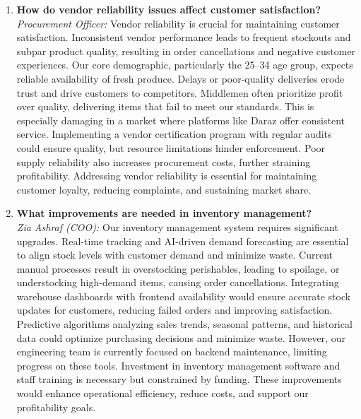 \documentclass[12pt,a4paper]{article}
\begin{document}
\begin{enumerate}
    \item \textbf{How do vendor reliability issues affect customer satisfaction?} \\
    \textit{Procurement Officer:} Vendor reliability is crucial for maintaining customer satisfaction. Inconsistent vendor performance leads to frequent stockouts and subpar product quality, resulting in order cancellations and negative customer experiences. Our core demographic, particularly the 25–34 age group, expects reliable availability of fresh produce. Delays or poor-quality deliveries erode trust and drive customers to competitors. Middlemen often prioritize profit over quality, delivering items that fail to meet our standards. This is especially damaging in a market where platforms like Daraz offer consistent service. Implementing a vendor certification program with regular audits could ensure quality, but resource limitations hinder enforcement. Poor supply reliability also increases procurement costs, further straining profitability. Addressing vendor reliability is essential for maintaining customer loyalty, reducing complaints, and sustaining market share.

    \item \textbf{What improvements are needed in inventory management?} \\
    \textit{Zia Ashraf (COO):} Our inventory management system requires significant upgrades. Real-time tracking and AI-driven demand forecasting are essential to align stock levels with customer demand and minimize waste. Current manual processes result in overstocking perishables, leading to spoilage, or understocking high-demand items, causing order cancellations. Integrating warehouse dashboards with frontend availability would ensure accurate stock updates for customers, reducing failed orders and improving satisfaction. Predictive algorithms analyzing sales trends, seasonal patterns, and historical data could optimize purchasing decisions and minimize waste. However, our engineering team is currently focused on backend maintenance, limiting progress on these tools. Investment in inventory management software and staff training is necessary but constrained by funding. These improvements would enhance operational efficiency, reduce costs, and support our profitability goals.


\end{enumerate}
\end{document}

